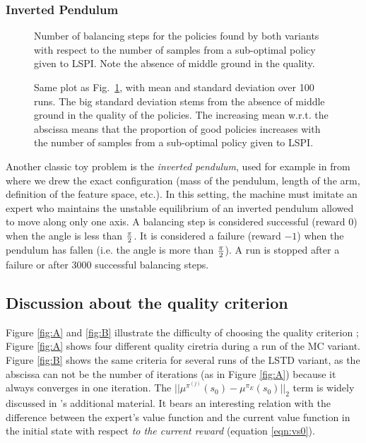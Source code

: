 \documentclass{jfpda2011}
\begin{document}
\subsubsection{Inverted Pendulum}
\begin{figure}
\centering
\resizebox{\columnwidth}{!}{}
\caption{Number of balancing steps for the policies found by both variants with respect to the number of samples from a sub-optimal policy given to LSPI. Note the absence of middle ground in the quality.}
\label{fig:threshold}
\end{figure}
\begin{figure}
\centering
\resizebox{\columnwidth}{!}{}
\caption{Same plot as Fig.~\ref{fig:threshold}, with mean and standard deviation over 100 runs. The big standard deviation stems from the absence of middle ground in the quality of the policies. The increasing mean w.r.t. the abscissa means that the proportion of good policies increases with the number of samples from a sub-optimal policy given to LSPI.}
\label{fig:threshold_EB}
\end{figure}
Another classic toy problem is the \emph{inverted pendulum}, used for example in \citep{lagoudakis2003least} from where we drew the exact configuration (mass of the pendulum, length of the arm, definition of the feature space, etc.). In this setting, the machine must imitate an expert who maintains the unstable equilibrium of an inverted pendulum allowed to move along only one axis. A balancing step is considered successful (reward $0$) when the angle is less than $\pi\over 2$. It is considered a failure (reward $-1$) when the pendulum has fallen (i.e. the angle is more than $\pi \over 2$). A run is stopped after a failure or after 3000 successful balancing steps.\\

\subsection{Discussion about the quality criterion}
\label{ssec:quality}
Figure \ref{fig:A} and \ref{fig:B} illustrate the difficulty of choosing the quality criterion ; Figure \ref{fig:A} shows four different quality ciretria during a run of the MC variant. Figure \ref{fig:B} shows the same criteria for several runs of the LSTD variant, as the abscissa can not be the number of iterations (as in Figure \ref{fig:A}) because it always converges in one iteration. The $||\mu^{\pi^{(j)}}(s_0) - \mu^{\pi_E}(s_0)||_2$ term is widely discussed in \citep{abbeel2004apprenticeship}'s additional material. It bears an interesting relation with the difference between the expert's value function and the current value function in the initial state with respect \emph{to the current reward} (equation \ref{eqn:vs0}).\\
\end{document}
